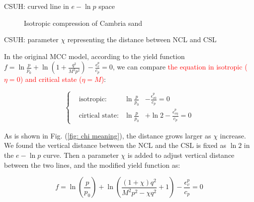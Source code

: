 \documentclass[aspectratio=169]{beamer}
\begin{document}
\begin{frame}{CSUH: curved line in $e-\ln{p}$ space}
\begin{minipage}{0.33\linewidth}
\begin{figure}
            \caption{Isotropic compression of Cambria sand}
            \label{fig: Isotropic compression of Cambria sand}
        \end{figure}
    \end{minipage}
\end{frame}

\begin{frame}{CSUH: parameter $\chi$ representing the distance between NCL and CSL}
	\fontsize{9}{9}\selectfont
	\begin{minipage}[c]{0.6\linewidth}
		In the original MCC model, according to the yield function $f=\ln{\frac{p}{p_0}}+\ln{\left(1+\frac{q^2}{M^2p^2}\right)}-\frac{\epsilon_v^p}{c_p}=0$, we can compare \textcolor{red}{the equation in isotropic ($\eta = 0$) and critical state ($\eta=M$)}:
		
		\vspace{-2mm}
		\begin{equation}
			\left\{\begin{aligned}
				&\text{isotropic:} &\ln{\frac{p}{p_0}}&-\frac{\epsilon_{v0}^p}{c_p} = 0\\
				&\text{cirtical state:} &\ln{\frac{p}{p_0}}&+\ln{2} - \frac{\epsilon_{v\eta}^p}{c_p} = 0
			\end{aligned}
			\right.
			\label{eq: distance btween NCL and CSL}
		\end{equation}
	
		\vspace{-2mm}
		As is shown in Fig. (\ref{fig: chi meaning}), the distance grows larger as $\chi$ increase.
		We found the vertical distance between the NCL and the CSL is fixed as $\ln 2$ in the $e-\ln p$ curve. 
		Then a parameter $\chi$ is added to adjust vertical distance between the two lines, and the modified yield function as:
		
		\vspace{-2mm}
		\begin{equation}
			f=\ln \left(\frac{p}{p_0}\right) + \ln\left(\frac{(1+\chi) q^{2}}{M^{2} p^{2}-\chi q^{2}}+1\right)-\frac{\epsilon_v^p}{c_p}=0
			\label{eq: yield function after chi added}
		\end{equation}
	

\end{minipage}
\end{frame}
\end{document}

